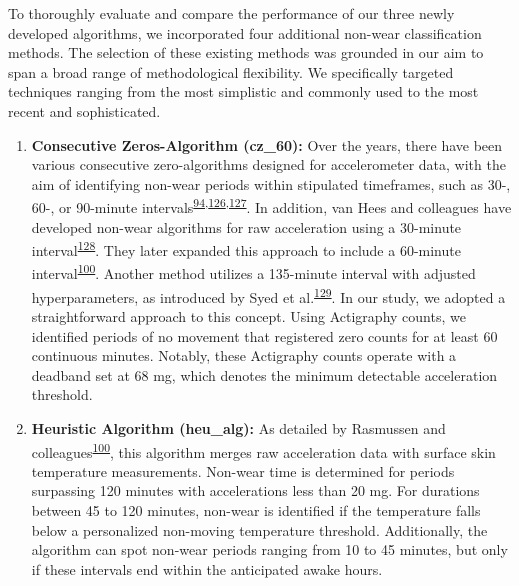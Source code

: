 \documentclass[
  10pt,
]{scrbook}
\begin{document}
To thoroughly evaluate and compare the performance of our three newly
developed algorithms, we incorporated four additional non-wear
classification methods. The selection of these existing methods was
grounded in our aim to span a broad range of methodological flexibility.
We specifically targeted techniques ranging from the most simplistic and
commonly used to the most recent and sophisticated.

\begin{enumerate}
\def\labelenumi{\arabic{enumi}.}
\item
  \textsf{\textbf{Consecutive Zeros-Algorithm (cz\_60):}} Over the
  years, there have been various consecutive zero-algorithms designed
  for accelerometer data, with the aim of identifying non-wear periods
  within stipulated timeframes, such as 30-, 60-, or 90-minute
  intervals\textsuperscript{\protect\hyperlink{ref-hecht_methodology_2009}{94},\protect\hyperlink{ref-troiano_physical_2008}{126},\protect\hyperlink{ref-choi_validation_2011}{127}}.
  In addition, van Hees and colleagues have developed non-wear
  algorithms for raw acceleration using a 30-minute
  interval\textsuperscript{\protect\hyperlink{ref-van_hees_estimation_2011}{128}}.
  They later expanded this approach to include a 60-minute
  interval\textsuperscript{\protect\hyperlink{ref-rasmussen_short-term_2020}{100}}.
  Another method utilizes a 135-minute interval with adjusted
  hyperparameters, as introduced by Syed et
  al.\textsuperscript{\protect\hyperlink{ref-syed_evaluating_2020}{129}}.
  In our study, we adopted a straightforward approach to this concept.
  Using Actigraphy counts, we identified periods of no movement that
  registered zero counts for at least 60 continuous minutes. Notably,
  these Actigraphy counts operate with a deadband set at 68 mg, which
  denotes the minimum detectable acceleration threshold.
\item
  \textsf{\textbf{Heuristic Algorithm (heu\_alg):}} As detailed by
  Rasmussen and
  colleagues\textsuperscript{\protect\hyperlink{ref-rasmussen_short-term_2020}{100}},
  this algorithm merges raw acceleration data with surface skin
  temperature measurements. Non-wear time is determined for periods
  surpassing 120 minutes with accelerations less than 20 mg. For
  durations between 45 to 120 minutes, non-wear is identified if the
  temperature falls below a personalized non-moving temperature
  threshold. Additionally, the algorithm can spot non-wear periods
  ranging from 10 to 45 minutes, but only if these intervals end within
  the anticipated awake hours.

\end{enumerate}
\end{document}
